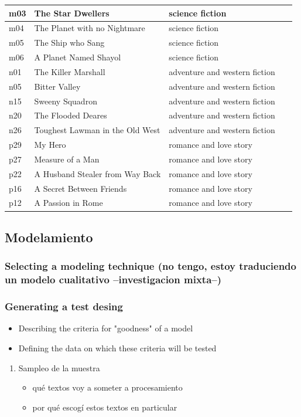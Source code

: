 \documentclass[twoside]{article}
\begin{document}
\begin{table}[!ht]
\begin{tabular}{|l|l|l|l|}
        m03 & The Star Dwellers & science fiction & ~ \\ \hline
        m04 & The Planet with no Nightmare & science fiction & ~ \\ \hline
        m05 & The Ship who Sang & science fiction & ~ \\ \hline
        m06 & A Planet Named Shayol & science fiction & ~ \\ \hline
        n01 & The Killer Marshall & adventure and western fiction & ~ \\ \hline
        n05 & Bitter Valley & adventure and western fiction & ~ \\ \hline
        n15 & Sweeny Squadron & adventure and western fiction & ~ \\ \hline
        n20 & The Flooded Deares & adventure and western fiction & ~ \\ \hline
        n26 & Toughest Lawman in the Old West & adventure and western fiction & ~ \\ \hline
        p29 & My Hero & romance and love story & ~ \\ \hline
        p27 & Measure of a Man & romance and love story & ~ \\ \hline
        p22 & A Husband Stealer from Way Back & romance and love story & ~ \\ \hline
        p16 & A Secret Between Friends & romance and love story & ~ \\ \hline
        p12 & A Passion in Rome & romance and love story & ~ \\ \hline
    \end{tabular}
\end{table}
\subsection{Modelamiento}
\label{sec:orge69e4a8}
\subsubsection{Selecting a modeling technique (no tengo, estoy traduciendo un modelo cualitativo --investigacion mixta--)}
\label{sec:org6533610}
\subsubsection{Generating a test desing}
\label{sec:org3ee4752}


\begin{itemize}
\item Describing the criteria for "goodness" of a model
\item Defining the data on which these criteria will be tested
\end{itemize}
\begin{enumerate}
\item Sampleo de la muestra
\label{sec:org6edcb26}
\begin{itemize}
\item qué textos voy a someter a procesamiento
\item por qué escogí estos textos en particular
\end{itemize}
\end{enumerate}
\end{document}
